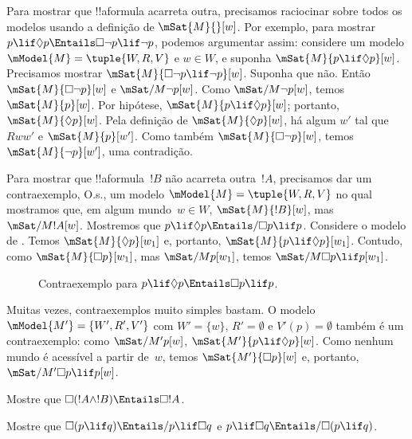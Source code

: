 \documentclass[../../../include/open-logic-section]{subfiles}
\begin{document}
\begin{ex}
  Para mostrar que !!a{formula} acarreta outra, precisamos raciocinar
  sobre todos os modelos usando a definição de $\mSat{M}{}[w]$. Por
  exemplo, para mostrar $p \lif \Diamond p \Entails \Box\lnot p \lif
  \lnot p$, podemos argumentar assim: considere um modelo $\mModel{M} =
  \tuple{W, R, V}$ e $w \in W$, e suponha $\mSat{M}{p \lif \Diamond
  p}[w]$. Precisamos mostrar $\mSat{M}{\Box\lnot p \lif \lnot p}[w]$.
  Suponha que não. Então $\mSat{M}{\Box\lnot p}[w]$ e
  $\mSat/{M}{\lnot p}[w]$. Como $\mSat/{M}{\lnot p}[w]$, temos
  $\mSat{M}{p}[w]$. Por hipótese, $\mSat{M}{p \lif \Diamond p}[w]$;
  portanto, $\mSat{M}{\Diamond p}[w]$. Pela definição de
  $\mSat{M}{\Diamond p}[w]$, há algum $w'$ tal que $Rww'$ e
  $\mSat{M}{p}[w']$. Como também $\mSat{M}{\Box \lnot p}[w]$, temos
  $\mSat{M}{\lnot p}[w']$, uma contradição.

  Para mostrar que !!a{formula}~$!B$ não acarreta outra~$!A$, precisamos
  dar um contraexemplo, O.s.\@, um modelo $\mModel{M} = \tuple{W, R, V}$
  no qual mostramos que, em algum mundo~$w \in W$, $\mSat{M}{!B}[w]$,
  mas $\mSat/{M}{!A}[w]$. Mostremos que $p \lif \Diamond p \Entails/
  \Box p \lif p$. Considere o modelo de . Temos
  $\mSat{M}{\Diamond p}[w_1]$ e, portanto, $\mSat{M}{p \lif \Diamond
  p}[w_1]$. Contudo, como $\mSat{M}{\Box p}[w_1]$, mas
  $\mSat/{M}{p}[w_1]$, temos $\mSat/{M}{\Box p \lif p}[w_1]$.
  \begin{figure}
  \begin{center}
  \end{center}
  \caption{Contraexemplo para $p \lif \Diamond p
  \Entails \Box p \lif p$.}
  \end{figure}
  
  Muitas vezes, contraexemplos muito simples bastam. O modelo $\mModel{M'}
  = \{W', R', V'\}$ com $W' = \{w\}$, $R' = \emptyset$ e $V'(p) =
  \emptyset$ também é um contraexemplo: como $\mSat/{M'}{p}[w]$,
  $\mSat{M'}{p \lif \Diamond p}[w]$. Como nenhum mundo é acessível a
  partir de~$w$, temos $\mSat{M'}{\Box p}[w]$ e, portanto,
  $\mSat/{M'}{\Box p \lif p}[w]$.
\end{ex}

\begin{prob}
  Mostre que $\Box (!A \land !B) \Entails \Box !A$.
\end{prob}

\begin{prob}
  Mostre que $\Box (p \lif q) \Entails/ p \lif \Box q$ e $p \lif \Box
  q \Entails/\Box (p \lif q)$.
\end{prob}
\end{document}
